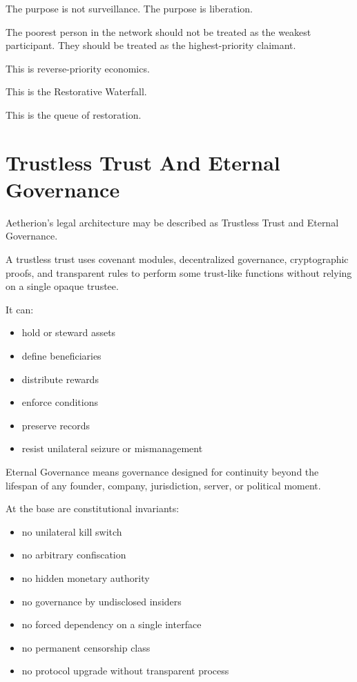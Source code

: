 ﻿\documentclass[12pt]{article}
\begin{document}
The purpose is not surveillance. The purpose is liberation.

The poorest person in the network should not be treated as the weakest participant. They should be treated as the highest-priority claimant.

This is reverse-priority economics.

This is the Restorative Waterfall.

This is the queue of restoration.

\section{Trustless Trust And Eternal Governance}


Aetherion's legal architecture may be described as Trustless Trust and Eternal Governance.

A trustless trust uses covenant modules, decentralized governance, cryptographic proofs, and transparent rules to perform some trust-like functions without relying on a single opaque trustee.

It can:

\begin{itemize}
  \item hold or steward assets
  \item define beneficiaries
  \item distribute rewards
  \item enforce conditions
  \item preserve records
  \item resist unilateral seizure or mismanagement
\end{itemize}

Eternal Governance means governance designed for continuity beyond the lifespan of any founder, company, jurisdiction, server, or political moment.

At the base are constitutional invariants:

\begin{itemize}
  \item no unilateral kill switch
  \item no arbitrary confiscation
  \item no hidden monetary authority
  \item no governance by undisclosed insiders
  \item no forced dependency on a single interface
  \item no permanent censorship class
  \item no protocol upgrade without transparent process
\end{itemize}
\end{document}
